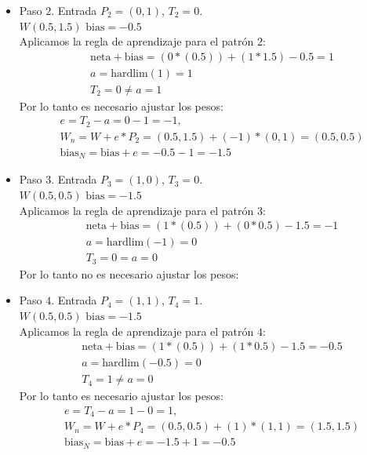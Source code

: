 \documentclass{article}
\begin{document}
{{\begin{itemize}
\begin{itemize}
\item Paso $2$. Entrada $P_2 = (0, 1)$, $T_2 = 0$. \\
$W(0.5, 1.5)$  $\text{bias} = -0.5$ \\

Aplicamos la regla de aprendizaje para el patrón $2$:
\begin{align*}
&\text{neta} + \text{bias}= (0 * (0.5)) + (1 * 1.5) - 0.5 = 1\\
&a = \text{hardlim}(1) = 1 \\
&T_2 = 0 \neq a = 1
\end{align*}
Por lo tanto es necesario ajustar los pesos:
\begin{align*}
&e = T_2 - a = 0- 1 =  -1, \\
&W_n = W + e* P_2 = (0.5, 1.5) + (-1) * (0,1) = (0.5, 0.5) \\
&\text{bias}_N = \text{bias} + e = -0.5 - 1 = -1.5
\end{align*}

\item Paso $3$. Entrada $P_3 = (1, 0)$, $T_3 = 0$. \\
$W(0.5, 0.5)$  $\text{bias} = -1.5$ \\

Aplicamos la regla de aprendizaje para el patrón $3$:
\begin{align*}
&\text{neta} + \text{bias}= (1 * (0.5)) + (0 * 0.5) - 1.5 = -1\\
&a = \text{hardlim}(-1) = 0 \\
&T_3 = 0 = a = 0
\end{align*}
Por lo tanto no es necesario ajustar los pesos:

\item Paso $4$. Entrada $P_4 = (1, 1)$, $T_4 = 1$. \\
$W(0.5, 0.5)$  $\text{bias} = -1.5$ \\

Aplicamos la regla de aprendizaje para el patrón $4$:
\begin{align*}
&\text{neta} + \text{bias}= (1 * (0.5)) + (1 * 0.5) - 1.5 = -0.5\\
&a = \text{hardlim}(-0.5) = 0 \\
&T_4 = 1 \neq a = 0
\end{align*}
Por lo tanto es necesario ajustar los pesos:
\begin{align*}
&e = T_4 - a = 1- 0 =  1, \\
&W_n = W + e* P_4 = (0.5, 0.5) + (1) * (1,1) = (1.5, 1.5) \\
&\text{bias}_N = \text{bias} + e = -1.5 + 1 = -0.5
\end{align*}
\end{itemize}


\end{itemize}}}
\end{document}
